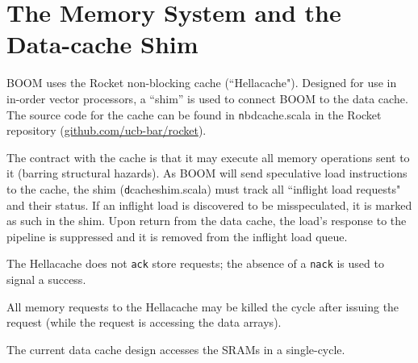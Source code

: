 
\chapter{The Memory System and the Data-cache Shim}\label{chapter:memory}

BOOM uses the Rocket non-blocking cache (``Hellacache").  Designed for use in in-order vector processors, a ``shim'' is used to connect BOOM to the data cache. The source code for the cache can be found in {\texttt nbdcache.scala} in the Rocket repository (\url{github.com/ucb-bar/rocket}). 

The contract with the cache is that it may execute all memory operations sent to it (barring structural hazards).  As BOOM will send speculative load instructions to the cache, the shim ({\texttt dcacheshim.scala})  must track all ``inflight load requests" and their status. If an inflight load is discovered to be misspeculated, it is marked as such in the shim.  Upon return from the data cache, the load's response to the pipeline is suppressed and it is removed from the inflight load queue. 

The Hellacache does not {\tt ack} store requests; the absence of a {\tt nack} is used to signal a success. 

All memory requests to the Hellacache may be killed the cycle after issuing the request (while the request is accessing the data arrays).  

The current data cache design accesses the SRAMs in a single-cycle. 
